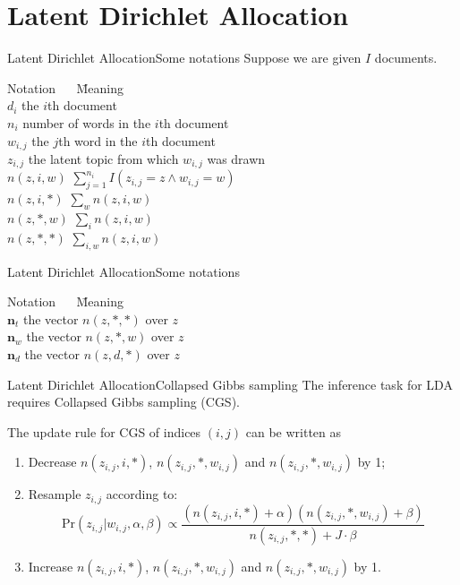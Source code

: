 \documentclass{beamer}
\renewcommand{\vec}{\mathbf}
\begin{document}
  
  \section{Latent Dirichlet Allocation}
  \begin{frame}{Latent Dirichlet Allocation}{Some notations}
    Suppose we are given $I$ documents.
    \begin{tabbing}
      Notation $\quad$ \=  Meaning \\
      $d_i$ \> the $i$th document \\
      $n_i$ \> number of words in the $i$th document \\
      $w_{i, j}$ \> the $j$th word in the $i$th document \\
      $z_{i, j}$ \> the latent topic from which $w_{i, j}$ was drawn \\
      $n(z, i, w)$ \> $\sum_{j = 1}^{n_i} I(z_{i, j} = z \wedge w_{i, j} = w) $ \\
      $n(z, i, *)$ \> $\sum_{w} n(z, i, w)$ \\
      $n(z, *, w)$ \> $\sum_{i} n(z, i, w)$ \\
      $n(z, *, *)$ \> $\sum_{i, w} n(z, i, w)$ 
    \end{tabbing}
  \end{frame}
  
  \begin{frame}{Latent Dirichlet Allocation}{Some notations}
    \begin{tabbing}
      Notation $\quad$ \=  Meaning \\
      $\vec{n}_t$ \> the vector $n(z, *, *)$ over $z$ \\
      $\vec{n}_w$ \> the vector $n(z, *, w)$ over $z$ \\
      $\vec{n}_d$ \> the vector $n(z, d, *)$ over $z$ 
    \end{tabbing}
  \end{frame}
  
  \begin{frame}{Latent Dirichlet Allocation}{Collapsed Gibbs sampling}
    The inference task for LDA requires Collapsed Gibbs sampling (CGS). \par
    \pause
    The update rule for CGS of indices $(i, j)$ can be written as 
    \begin{enumerate}
      \item Decrease $n(z_{i, j}, i, *)$, $n(z_{i, j}, *, w_{i, j})$ and $n(z_{i, j}, *, w_{i, j})$ by 1;
      \item Resample $z_{i,j}$ according to:
      $$ \text{Pr}(z_{i, j} | w_{i, j}, \alpha, \beta) \propto \frac{(n(z_{i,j},i,*)+\alpha)(n(z_{i,j},*,w_{i,j})+\beta)}{n(z_{i,j}, *, *) + J \cdot \beta} $$
      \item Increase $n(z_{i, j}, i, *)$, $n(z_{i, j}, *, w_{i, j})$ and $n(z_{i, j}, *, w_{i, j})$ by 1.
    \end{enumerate}
  \end{frame}
  
\end{document}
